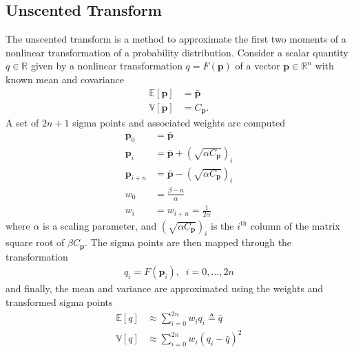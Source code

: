 \documentclass[journal ]{new-aiaa}
\newcommand{\param}{\ensuremath{\mathbf{p}}}
\newcommand{\E}[1]{\mathbb{E}\left[#1\right]}
\newcommand{\V}[1]{\mathbb{V}[#1]}
\newcommand{\cov}{C}
\begin{document}
\subsection*{Unscented Transform}
The unscented transform is a method to approximate the first two moments of a nonlinear transformation of a probability distribution. Consider a scalar quantity $q\in\mathbb{R}$ given by a nonlinear transformation $q = F(\param)$ of a vector $\param\in\mathbb{R}^n$ with known mean and covariance
\begin{align*}
\E{\param} &= \bar{\param}\\
\V{\param} &= \cov_{\param}.
\end{align*}
A set of $2n+1$ sigma points and associated weights are computed 
\begin{align*}
\param_0 &= \bar{\param} \\
\param_i &=  \bar{\param} + \left(\sqrt{\alpha \cov_{\param}}\right)_i \\
\param_{i+n} &=  \bar{\param} - \left(\sqrt{\alpha\cov_{\param}}\right)_i \\
w_0 &= \frac{\beta - n}{\alpha} \\
w_i &= w_{i+n} = \frac{1}{2\alpha}
\end{align*}
where $\alpha$ is a scaling parameter, and $\left(\sqrt{\alpha \cov_{\param}}\right)_i$ is the $i^{\mathrm{th}}$ column of the matrix square root of $\beta \cov_{\param}$. The sigma points are then mapped through the transformation
\begin{align}
q_i = F(\param_i),\;\;i=0,...,2n
\end{align}
and finally, the mean and variance are approximated using the weights and transformed sigma points
\begin{align*}
\E{q} &\approx \sum_{i=0}^{2n}w_iq_i  \triangleq \bar{q}\\
\V{q} &\approx \sum_{i=0}^{2n}w_i\left(q_i - \bar{q}\right)^2
\end{align*}
\end{document}

